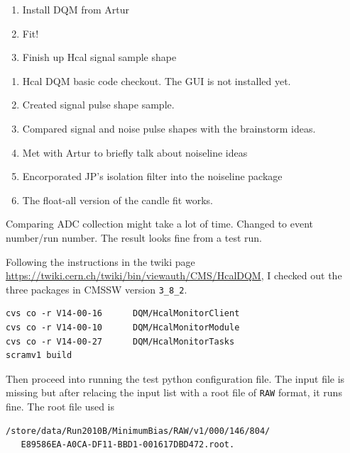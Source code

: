 

\begin{enumerate}
\item Install DQM from Artur
\item Fit!
\item Finish up Hcal signal sample shape
\end{enumerate}


\begin{enumerate}
\item Hcal DQM basic code checkout.  The GUI is not installed yet.
\item Created signal pulse shape sample.
\item Compared signal and noise pulse shapes with the brainstorm ideas.
\item Met with Artur to briefly talk about noiseline ideas
\item Encorporated JP's isolation filter into the noiseline package
\item The float-all version of the candle fit works.
\end{enumerate}


Comparing ADC collection might take a lot of time.  Changed to event number/run number.  The result looks fine from a test run.



Following the instructions in the twiki page \url{https://twiki.cern.ch/twiki/bin/viewauth/CMS/HcalDQM},
I checked out the three packages in CMSSW version \texttt{3\_8\_2}.

\begin{verbatim}
cvs co -r V14-00-16      DQM/HcalMonitorClient
cvs co -r V14-00-10      DQM/HcalMonitorModule
cvs co -r V14-00-27      DQM/HcalMonitorTasks
scramv1 build
\end{verbatim}

Then proceed into running the test python configuration file.  The input file is missing but after relacing
the input list with a root file of \texttt{RAW} format, it runs fine.  The root file used is

\begin{verbatim}
/store/data/Run2010B/MinimumBias/RAW/v1/000/146/804/
   E89586EA-A0CA-DF11-BBD1-001617DBD472.root.
\end{verbatim}

